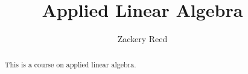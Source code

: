 \documentclass{xourse}
\title{Applied Linear Algebra}
\author{Zackery Reed}
\begin{document}
\begin{abstract}
    This is a course on applied linear algebra.
\end{abstract}
\maketitle

\end{document}
